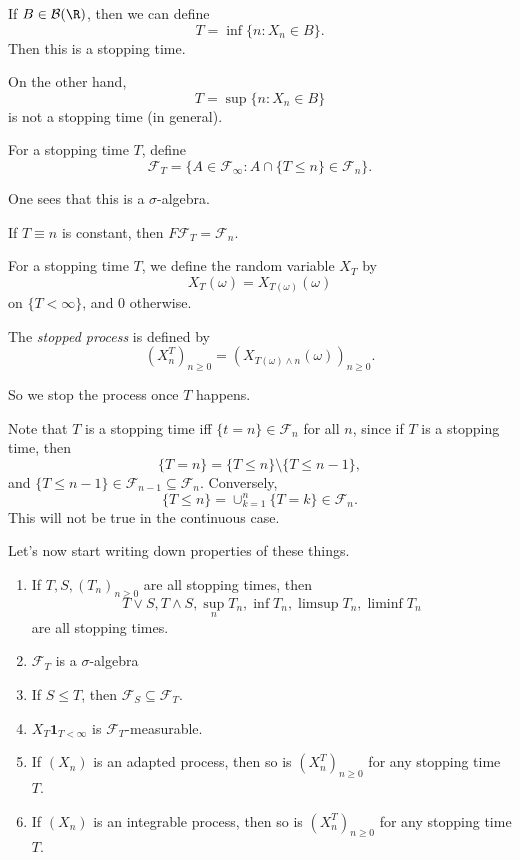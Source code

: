 \documentclass[a4paper]{article}
\begin{document}
\begin{eg}
  If $B \in \mathcal{B}(\R)$, then we can define
  \[
    T = \inf \{n : X_n \in B\}.
  \]
  Then this is a stopping time.

  On the other hand,
  \[
    T = \sup \{n: X_n \in B\}
  \]
  is not a stopping time (in general).
\end{eg}

\begin{defi}[$\mathcal{F}_T$]
  For a stopping time $T$, define
  \[
    \mathcal{F}_T = \{A \in \mathcal{F}_\infty : A \cap \{T \leq n\} \in \mathcal{F}_n\}.
  \]
\end{defi}
One sees that this is a $\sigma$-algebra.

\begin{eg}
  If $T \equiv n$ is constant, then $F\mathcal{F}_T = \mathcal{F}_n$.
\end{eg}

\begin{defi}[$X_T$]
  For a stopping time $T$, we define the random variable $X_T$ by
  \[
    X_T (\omega) = X_{T(\omega)}(\omega)
  \]
  on $\{T < \infty\}$, and $0$ otherwise.
\end{defi}

\begin{defi}
  The \emph{stopped process} is defined by
  \[
    (X_n^T)_{n \geq 0} = (X_{T(\omega) \wedge n}(\omega))_{n \geq 0}.
  \]
\end{defi}
So we stop the process once $T$ happens.

Note that $T$ is a stopping time iff $\{t = n \} \in \mathcal{F}_n$ for all $n$, since if $T$ is a stopping time, then
\[
  \{T = n\} = \{T \leq n\} \setminus \{T \leq n - 1\},
\]
and $\{T \leq n- 1\} \in \mathcal{F}_{n - 1} \subseteq \mathcal{F}_n$. Conversely,
\[
  \{T \leq n \} = \cup_{k = 1}^n \{T = k\} \in \mathcal{F}_n.
\]
This will not be true in the continuous case.

Let's now start writing down properties of these things.

\begin{prop}\leavevmode
  \begin{enumerate}
    \item If $T, S, (T_n)_{n \geq 0}$ are all stopping times, then
      \[
        T \vee S, T \wedge S, \sup_n T_n, \inf T_n, \limsup T_n, \liminf T_n
      \]
      are all stopping times.
    \item $\mathcal{F}_T$ is a $\sigma$-algebra
    \item If $S \leq T$, then $\mathcal{F}_S \subseteq \mathcal{F}_T$.
    \item $X_T \mathbf{1}_{T < \infty}$ is $\mathcal{F}_T$-measurable.
    \item If $(X_n)$ is an adapted process, then so is $(X^T_n)_{n \geq 0}$ for any stopping time $T$.
    \item If $(X_n)$ is an integrable process, then so is $(X^T_n)_{n \geq 0}$ for any stopping time $T$.
  \end{enumerate}
\end{prop}
\end{document}
